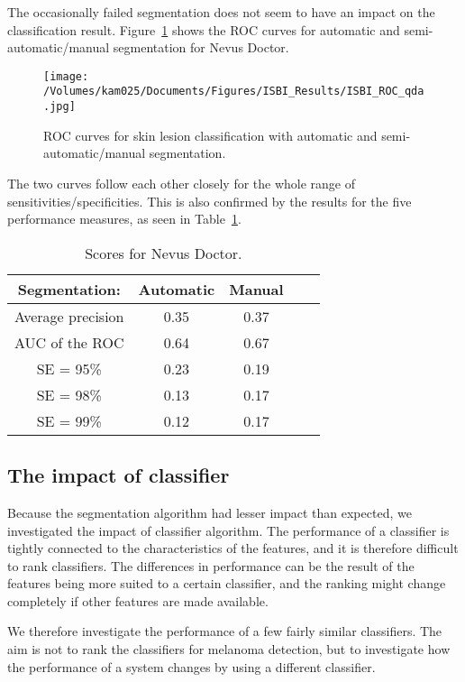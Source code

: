 \documentclass[a4paper,12pt]{article}
\begin{document}
The occasionally failed segmentation does not seem to have an impact on the classification result.
Figure~\ref{fig:ROC} shows the ROC curves for automatic and semi-automatic/manual segmentation for Nevus Doctor. 
  \begin{figure}[h!]
     \texttt{[image: /Volumes/kam025/Documents/Figures/ISBI\_Results/ISBI\_ROC\_qda.jpg]}
      \caption{ROC curves for skin lesion classification with automatic and semi-automatic/manual segmentation.}
       \label{fig:ROC}
   \end{figure}
The two curves follow each other closely for the whole range of sensitivities/specificities. 
This is also confirmed by the results for the five performance measures, as seen in Table~\ref{tab:ND_Rankings}.    
\begin{table}[h!]
\begin{tabular}{c | c | c | c | c}
        Segmentation: &{Automatic} & {Manual} \\
        \hline
  Average precision & 0.35 & 0.37 \\
  AUC of the ROC & 0.64 & 0.67 \\
  SE = 95\% & 0.23 & 0.19 \\
  SE = 98\%  & 0.13 & 0.17 \\
  SE = 99\%  & 0.12  & 0.17
\end{tabular}
  \caption{Scores for Nevus Doctor.}
  \label{tab:ND_Rankings}
\end{table}

\subsection{The impact of classifier} 

Because the segmentation algorithm had lesser impact than expected, we investigated the impact of classifier algorithm.
The performance of a classifier is tightly connected to the characteristics of the features, and it is therefore difficult to rank classifiers.
The differences in performance can be the result of the features being more suited to a certain classifier, and the ranking might change completely if other features are made available. 

 We therefore investigate the performance of a few fairly similar classifiers. 
 The aim is not to rank the classifiers for melanoma detection, but to investigate how the performance of a system changes by using a different classifier. 
\end{document}
